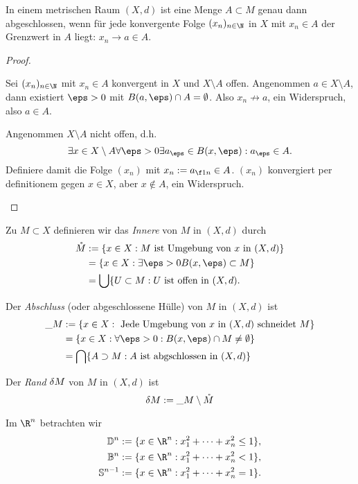 \begin{prop}
	In einem metrischen Raum $(X,d)$ ist eine Menge $A \subset M$ genau dann abgeschlossen,
	wenn für jede konvergente Folge $(x_n)_{n\in\N}$ in $X$ mit $x_n \in A$ der Grenzwert in $A$ liegt: $x_n \to a \in A$.
	\begin{proof}
		\begin{segnb}[„$\implies$“]
			Sei $(x_n)_{n\in\N}$ mit $x_n \in A$ konvergent in $X$ und $X \setminus A$ offen.
			Angenommen $a \in X \setminus A$, dann existiert $\eps > 0$ mit $B(a,\eps) \cap A = \emptyset$.
			Also $x_n \not\to a$, ein Widerspruch, also $a \in A$.
		\end{segnb}
		\begin{segnb}[„$\impliedby$“]
			Angenommen $X \setminus A$ nicht offen, d.h.
			\[
				\exists x \in X \setminus A \forall \eps > 0 \exists a_\eps \in B(x,\eps) : a_\eps \in A.
			\]
			Definiere damit die Folge $(x_n)$ mit $x_n := a_{\f 1n} \in A$.
			$(x_n)$ konvergiert per definitionem gegen $x \in X$, aber $x \not\in A$, ein Widerspruch.
		\end{segnb}
	\end{proof}
\end{prop}

\begin{df}
	Zu $M \subset X$ definieren wir das \emph{Innere} von $M$ in $(X,d)$ durch
	\begin{align*}
		\mathring M &:= \{ x \in X : M \text{ ist Umgebung von $x$ in $(X,d)$} \} \\
		&= \{ x \in X : \exists \eps > 0 B(x,\eps) \subset M \} \\
		&= \bigcup \{ U \subset M : U \text{ ist offen in $(X,d)$}.
	\end{align*}

	Der \emph{Abschluss} (oder abgeschlossene Hülle) von $M$ in $(X,d)$ ist
	\begin{align*}
		\_{M} &:= \{ x \in X : \text{ Jede Umgebung von $x$ in $(X,d)$ schneidet $M$} \} \\
		&= \{ x \in X : \forall \eps > 0 : B(x,\eps) \cap M \neq \emptyset \} \\
		&= \bigcap \{ A \supset M : \text{$A$ ist abgschlossen in $(X,d)$} \}
	\end{align*}

	Der \emph{Rand} $\delta M$ von $M$ in $(X,d)$ ist
	\[
		\delta M := \_{M} \setminus \mathring M
	\]
\end{df}

\begin{ex}
	Im $\R^n$ betrachten wir
	\begin{align*}
		\D^n := \{ x \in \R^n : x_1^2 + \dotsb + x_n^2 \le 1 \}, \\
		\B^n := \{ x \in \R^n : x_1^2 + \dotsb + x_n^2 < 1 \}, \\
		\S^{n-1} := \{ x \in \R^n : x_1^2 + \dotsb + x_n^2 = 1 \}.
	\end{align*}
\end{ex}

